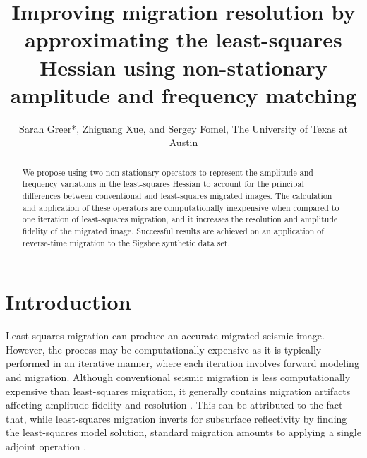 \title{Improving migration resolution by approximating the least-squares Hessian using non-stationary amplitude and frequency matching}

\usetikzlibrary{arrows,automata}
\author{Sarah Greer*, Zhiguang Xue, and Sergey Fomel, The University of Texas at Austin}
\label{ch:chapter-mighes}

\relax{}

\newcommand*{\tran}{^{\mkern-1.5mu\mathsf{T}}}
\maketitle
{}
\begin{abstract}
    We propose using two non-stationary operators to represent the amplitude and frequency variations in the least-squares Hessian to account for the principal differences between conventional and least-squares migrated images.
    The calculation and application of these operators are computationally inexpensive when compared to one iteration of least-squares migration, and it increases the resolution and amplitude fidelity of the migrated image.
    Successful results are achieved on an application of reverse-time migration to the Sigsbee synthetic data set.
\end{abstract}

\section{Introduction}
    Least-squares migration can produce an accurate migrated seismic image.
    However, the process may be computationally expensive as it is typically performed in an iterative manner, where each iteration involves forward modeling and migration. 
    Although conventional seismic migration is less computationally expensive than least-squares migration, it generally contains migration artifacts affecting amplitude fidelity and resolution \cite[]{lsamp,pwlsrtm}.
    This can be attributed to the fact that, while least-squares migration inverts for subsurface reflectivity by finding the least-squares model solution, standard migration amounts to applying a single adjoint operation \cite[]{pvi}. 

